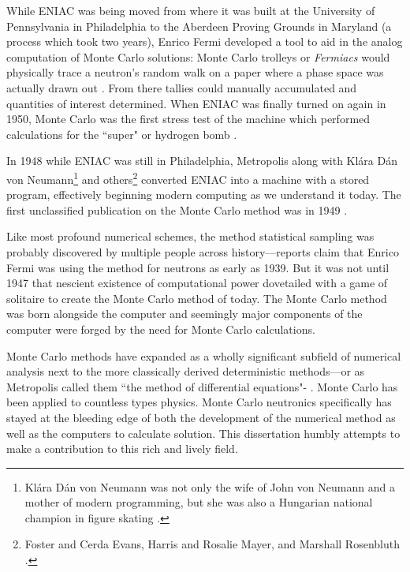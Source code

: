 While ENIAC was being moved from where it was built at the University of Pennsylvania in Philadelphia to the Aberdeen Proving Grounds in Maryland (a process which took two years), Enrico Fermi developed a tool to aid in the analog computation of Monte Carlo solutions:
Monte Carlo trolleys or \textit{Fermiacs} would physically trace a neutron's random walk on a paper where a phase space was actually drawn out \cite{metropolis_1987_history}.
From there tallies could manually accumulated and quantities of interest determined.
When ENIAC was finally turned on again in 1950, Monte Carlo was the first stress test of the machine which performed calculations for the ``super" or hydrogen bomb \cite{metropolis_1987_history}.

In 1948 while ENIAC was still in Philadelphia, Metropolis along with Klára Dán von Neumann\footnote{
Klára Dán von Neumann was not only the wife of John von Neumann and a mother of modern programming, but she was also a Hungarian national champion in figure skating \cite{dyson_2012_digital}.}
and others\footnote{Foster and Cerda Evans, Harris and Rosalie Mayer, and Marshall Rosenbluth \cite{switman_2017_unheralded}.} converted ENIAC into a machine with a stored program, effectively beginning modern computing as we understand it today.
The first unclassified publication on the Monte Carlo method was in 1949 \cite{metropolis_1949_monteCarlo}.

Like most profound numerical schemes, the method statistical sampling was probably discovered by multiple people across history---reports claim that Enrico Fermi was using the method for neutrons as early as 1939.
But it was not until 1947 that nescient existence of computational power dovetailed with a game of solitaire to create the Monte Carlo method of today.
The Monte Carlo method was born alongside the computer and seemingly major components of the computer were forged by the need for Monte Carlo calculations.

Monte Carlo methods have expanded as a wholly significant subfield of numerical analysis next to the more classically derived deterministic methods---or as Metropolis called them ``the method of differential equations"- \cite{anderson_1986_maniac}.
Monte Carlo has been applied to countless types physics.
Monte Carlo neutronics specifically has stayed at the bleeding edge of both the development of the numerical method as well as the computers to calculate solution.
This dissertation humbly attempts to make a contribution to this rich and lively field.


